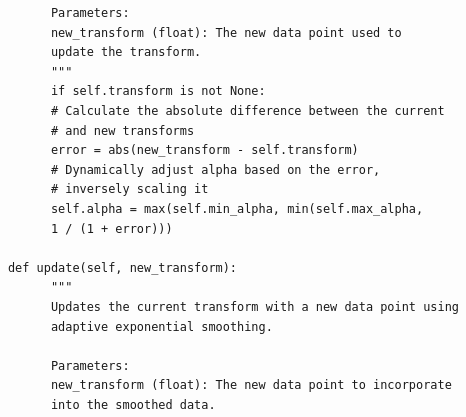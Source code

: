 \documentclass[12pt]{article}
\begin{document}
\begin{enumerate}
\begin{enumerate}
\begin{verbatim}
            Parameters:
            new_transform (float): The new data point used to 
            update the transform.
            """
            if self.transform is not None:
            # Calculate the absolute difference between the current 
            # and new transforms
            error = abs(new_transform - self.transform)
            # Dynamically adjust alpha based on the error, 
            # inversely scaling it
            self.alpha = max(self.min_alpha, min(self.max_alpha, 
            1 / (1 + error)))
                              
      def update(self, new_transform):
            """
            Updates the current transform with a new data point using
            adaptive exponential smoothing.
                                          
            Parameters:
            new_transform (float): The new data point to incorporate
            into the smoothed data.
                                          

\end{verbatim}
\end{enumerate}
\end{enumerate}
\end{document}
